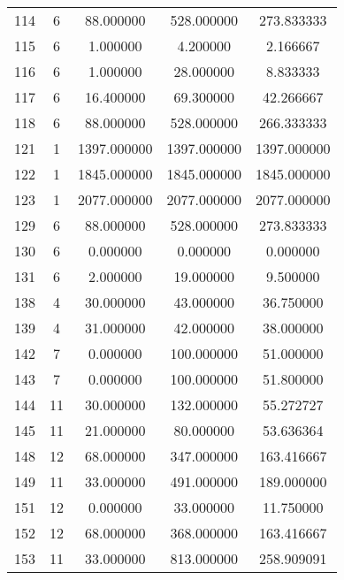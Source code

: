 \documentclass[a4paper,12pt]{article}
\begin{document}
\begin{center}
\begin{longtable}{l S[table-format=3.0] S[table-format=8.2] S[table-format=8.2] S[table-format=8.2]}
        114   &   6   &   88.000000   &    528.000000     &     273.833333 \\
        115   &   6   &    1.000000   &      4.200000     &       2.166667 \\
        116   &   6   &    1.000000   &     28.000000     &       8.833333 \\
        117   &   6   &   16.400000   &     69.300000     &      42.266667 \\
        118   &   6   &   88.000000   &    528.000000     &     266.333333 \\
        121   &   1   &  1397.000000   &   1397.000000     &    1397.000000 \\
        122   &   1   &  1845.000000   &   1845.000000     &    1845.000000 \\
        123   &   1   &  2077.000000   &   2077.000000     &    2077.000000 \\
        129   &   6   &   88.000000   &    528.000000     &     273.833333 \\
        130   &   6   &    0.000000   &      0.000000     &       0.000000 \\
        131   &   6   &    2.000000   &     19.000000     &       9.500000 \\
        138   &   4   &   30.000000   &     43.000000     &      36.750000 \\
        139   &   4   &   31.000000   &     42.000000     &      38.000000 \\
        142   &   7   &    0.000000   &    100.000000     &      51.000000 \\
        143   &   7   &    0.000000   &    100.000000     &      51.800000 \\
        144   &  11   &   30.000000   &    132.000000     &      55.272727 \\
        145   &  11   &   21.000000   &     80.000000     &      53.636364 \\
        148   &  12   &   68.000000   &    347.000000     &     163.416667 \\
        149   &  11   &   33.000000   &    491.000000     &     189.000000 \\
         151   &  12   &    0.000000   &     33.000000     &      11.750000 \\
        152   &  12   &   68.000000   &    368.000000     &     163.416667 \\
        153   &  11   &   33.000000   &    813.000000     &     258.909091 \\

\end{longtable}
\end{center}
\end{document}

